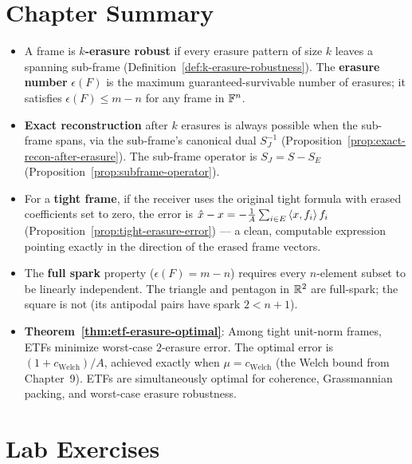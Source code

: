 \section{Chapter Summary}
\label{sec:summary-ch10}

\begin{itemize}
  \item A frame is \textbf{$k$-erasure robust} if every erasure pattern
        of size $k$ leaves a spanning sub-frame (Definition~\ref{def:k-erasure-robustness}).
        The \textbf{erasure number} $\epsilon(F)$ is the maximum
        guaranteed-survivable number of erasures; it satisfies
        $\epsilon(F)\le m-n$ for any frame in $\mathbb{F}^n$.

  \item \textbf{Exact reconstruction} after $k$ erasures is always
        possible when the sub-frame spans, via the sub-frame's canonical
        dual $S_J^{-1}$ (Proposition~\ref{prop:exact-recon-after-erasure}).
        The sub-frame operator is $S_J = S - S_E$
        (Proposition~\ref{prop:subframe-operator}).

  \item For a \textbf{tight frame}, if the receiver uses the original
        tight formula with erased coefficients set to zero, the error
        is $\hat x - x = -\tfrac{1}{A}\sum_{i\in E}\left\langle x, f_i \right\rangle f_i$
        (Proposition~\ref{prop:tight-erasure-error}) --- a clean,
        computable expression pointing exactly in the direction of the
        erased frame vectors.

  \item The \textbf{full spark} property ($\epsilon(F)=m-n$) requires
        every $n$-element subset to be linearly independent. The triangle
        and pentagon in $\mathbb{R}^2$ are full-spark; the square is not (its
        antipodal pairs have spark $2 < n+1$).

  \item \textbf{Theorem~\ref{thm:etf-erasure-optimal}}: Among tight
        unit-norm frames, ETFs minimize worst-case $2$-erasure error.
        The optimal error is $(1+c_{\text{Welch}})/A$, achieved exactly
        when $\mu = c_{\text{Welch}}$ (the Welch bound from Chapter~9).
        ETFs are simultaneously optimal for coherence, Grassmannian
        packing, and worst-case erasure robustness.
\end{itemize}

\section{Lab Exercises}
\label{sec:lab-ch10}


